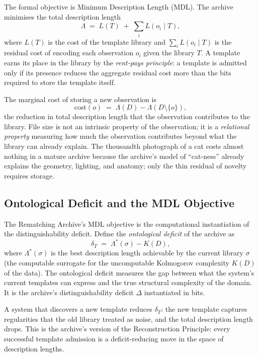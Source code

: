 \documentclass[12pt, letterpaper]{article}
\theoremstyle{remark}
\begin{document}
The formal objective is Minimum Description Length (MDL).  The archive
minimises the total description length
\begin{equation}
  \Lambda \;=\; L(T) \;+\; \sum_i L(o_i \mid T),
  \label{eq:mdl}
\end{equation}
where $L(T)$ is the cost of the template library and $\sum_i L(o_i \mid T)$
is the residual cost of encoding each observation $o_i$ given the library
$T$.  A template earns its place in the library by the \emph{rent-pays
principle}: a template is admitted only if its presence reduces the aggregate
residual cost more than the bits required to store the template itself.

The marginal cost of storing a new observation is
\begin{equation}
  \mathrm{cost}(o)
  \;=\;
  \Lambda(D) - \Lambda(D \setminus \{o\}),
\end{equation}
the reduction in total description length that the observation contributes
to the library.  File size is not an intrinsic property of the observation;
it is a \emph{relational property} measuring how much the observation
contributes beyond what the library can already explain.  The thousandth
photograph of a cat costs almost nothing in a mature archive because the
archive's model of ``cat-ness'' already explains the geometry, lighting,
and anatomy; only the thin residual of novelty requires storage.

\subsection{Ontological Deficit and the MDL Objective}

The Rematching Archive's MDL objective is the computational instantiation
of the distinguishability deficit.  Define the \emph{ontological deficit}
of the archive as
\begin{equation}
  \delta_T
  \;=\;
  \Lambda^*(\sigma) - K(D),
\end{equation}
where $\Lambda^*(\sigma)$ is the best description length achievable by the
current library $\sigma$ (the computable surrogate for the uncomputable
Kolmogorov complexity $K(D)$ of the data).  The ontological deficit measures
the gap between what the system's current templates can express and the
true structural complexity of the domain.  It is the archive's
distinguishability deficit $\Delta$ instantiated in bits.

A system that discovers a new template reduces $\delta_T$: the new template
captures regularities that the old library treated as noise, and the total
description length drops.  This is the archive's version of the
Reconstruction Principle: every successful template admission is a
deficit-reducing move in the space of description lengths.
\end{document}
